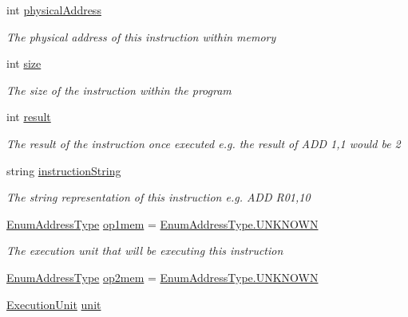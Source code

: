 \begin{DoxyCompactItemize}
int \hyperlink{class_c_p_u___o_s___simulator_1_1_c_p_u_1_1_instruction_a401c8f3740b63632e17db6f80b505a17}{physical\+Address}
\begin{DoxyCompactList}\small\item\em The physical address of this instruction within memory \end{DoxyCompactList}\item 
int \hyperlink{class_c_p_u___o_s___simulator_1_1_c_p_u_1_1_instruction_a8c533b0c08d8ac0a85b0e342f95cfeec}{size}
\begin{DoxyCompactList}\small\item\em The size of the instruction within the program \end{DoxyCompactList}\item 
int \hyperlink{class_c_p_u___o_s___simulator_1_1_c_p_u_1_1_instruction_a80637c7fae4090f9c73f468dbd6af7ee}{result}
\begin{DoxyCompactList}\small\item\em The result of the instruction once executed e.\+g. the result of A\+D\+D 1,1 would be 2 \end{DoxyCompactList}\item 
string \hyperlink{class_c_p_u___o_s___simulator_1_1_c_p_u_1_1_instruction_ab58373ca153de047b36c1036e07db7a8}{instruction\+String}
\begin{DoxyCompactList}\small\item\em The string representation of this instruction e.\+g. A\+D\+D R01,10 \end{DoxyCompactList}\item 
\hyperlink{namespace_c_p_u___o_s___simulator_1_1_c_p_u_ab76721f84dabbc14c907e6f11fbeb7c0}{Enum\+Address\+Type} \hyperlink{class_c_p_u___o_s___simulator_1_1_c_p_u_1_1_instruction_afd5431d96e8fb78594891c636f2191ca}{op1mem} = \hyperlink{namespace_c_p_u___o_s___simulator_1_1_c_p_u_ab76721f84dabbc14c907e6f11fbeb7c0a696b031073e74bf2cb98e5ef201d4aa3}{Enum\+Address\+Type.\+U\+N\+K\+N\+O\+W\+N}
\begin{DoxyCompactList}\small\item\em The execution unit that will be executing this instruction \end{DoxyCompactList}\item 
\hyperlink{namespace_c_p_u___o_s___simulator_1_1_c_p_u_ab76721f84dabbc14c907e6f11fbeb7c0}{Enum\+Address\+Type} \hyperlink{class_c_p_u___o_s___simulator_1_1_c_p_u_1_1_instruction_aff693a62e411c80f794d0443addfd04b}{op2mem} = \hyperlink{namespace_c_p_u___o_s___simulator_1_1_c_p_u_ab76721f84dabbc14c907e6f11fbeb7c0a696b031073e74bf2cb98e5ef201d4aa3}{Enum\+Address\+Type.\+U\+N\+K\+N\+O\+W\+N}
\item 
\hyperlink{class_c_p_u___o_s___simulator_1_1_c_p_u_1_1_execution_unit}{Execution\+Unit} \hyperlink{class_c_p_u___o_s___simulator_1_1_c_p_u_1_1_instruction_a0337c93fbfb5993eab37f1d052ca5f43}{unit}
\end{DoxyCompactItemize}


